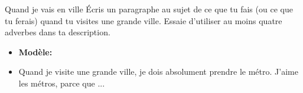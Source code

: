 \begin{frame}{Quand je vais en ville}
  Écris un paragraphe au sujet de ce que tu fais (ou ce que tu ferais) quand tu visites une grande ville.
  Essaie d'utiliser au moins  quatre \alert{adverbes} dans ta description.
  \begin{itemize}
    \item[] \textbf{Modèle:}
    \item Quand je visite une grande ville, je dois \alert{absolument} prendre le métro. J'aime les métros, parce que ...
  \end{itemize}
\end{frame}